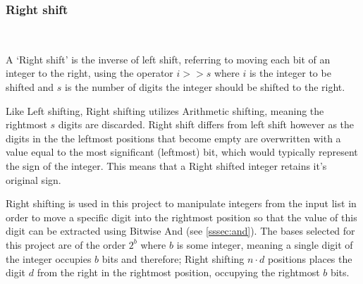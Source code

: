 \documentclass[12pt]{article}
\begin{document}
\subsubsection{Right shift}\
\label{sssec:rightshift}
\par
A `Right shift' is the inverse of left shift, referring to moving each bit of an integer to the right, using the operator $i >> s$ where $i$ is the integer to be shifted and $s$ is the number of digits the integer should be shifted to the right.
\par
Like Left shifting, Right shifting utilizes Arithmetic shifting, meaning the rightmost $s$ digits are discarded. Right shift differs from left shift however as the digits in the the leftmost positions that become empty are overwritten with a value equal to the most significant (leftmost) bit, which would typically represent the sign of the integer. This means that a Right shifted integer retains it's original sign.
\par
Right shifting is used in this project to manipulate integers from the input list in order to move a specific digit into the rightmost position so that the value of this digit can be extracted using Bitwise And (see \ref{sssec:and}). The bases selected for this project are of the order $2^b$ where $b$ is some integer, meaning a single digit of the integer occupies $b$ bits and therefore; Right shifting $n \cdot d$ positions places the digit $d$ from the right in the rightmost position, occupying the rightmost $b$ bits. 
\end{document}
